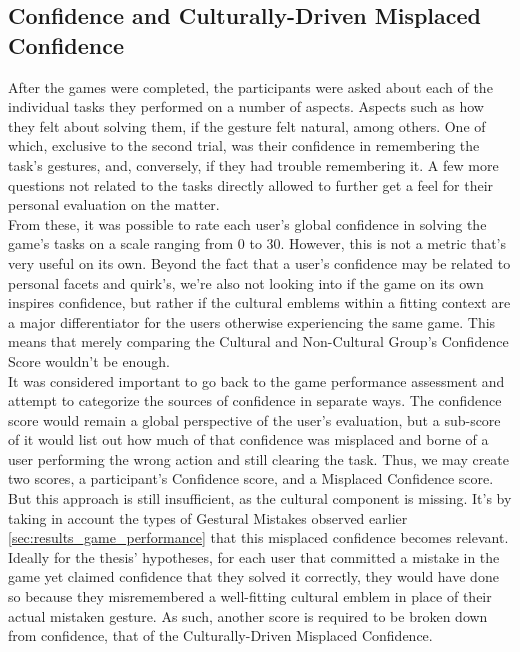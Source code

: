 \subsection{Confidence and Culturally-Driven Misplaced Confidence} \label{sec:results_surveys_confidence}
    After the games were completed, the participants were asked about each of the individual tasks they performed on a number of aspects. Aspects such as how they felt about solving them, if the gesture felt natural, among others. One of which, exclusive to the second trial, was their confidence in remembering the task's gestures, and, conversely, if they had trouble remembering it. A few more questions not related to the tasks directly allowed to further get a feel for their personal evaluation on the matter.\\
    From these, it was possible to rate each user's global confidence in solving the game's tasks on a scale ranging from 0 to 30. However, this is not a metric that's very useful on its own. Beyond the fact that a user's confidence may be related to personal facets and quirk's, we're also not looking into if the game on its own inspires confidence, but rather if the cultural emblems within a fitting context are a major differentiator for the users otherwise experiencing the same game. This means that merely comparing the Cultural and Non-Cultural Group's Confidence Score wouldn't be enough.\\
    It was considered important to go back to the game performance assessment and attempt to categorize the sources of confidence in separate ways. The confidence score would remain a global perspective of the user's evaluation, but a sub-score of it would list out how much of that confidence was misplaced and borne of a user performing the wrong action and still clearing the task. Thus, we may create two scores, a participant's Confidence score, and a Misplaced Confidence score. But this approach is still insufficient, as the cultural component is missing. It's by taking in account the types of Gestural Mistakes observed earlier \ref{sec:results_game_performance} that this misplaced confidence becomes relevant.\\
    Ideally for the thesis' hypotheses, for each user that committed a mistake in the game yet claimed confidence that they solved it correctly, they would have done so because they misremembered a well-fitting cultural emblem in place of their actual mistaken gesture. As such, another score is required to be broken down from confidence, that of the Culturally-Driven Misplaced Confidence.\\
    
